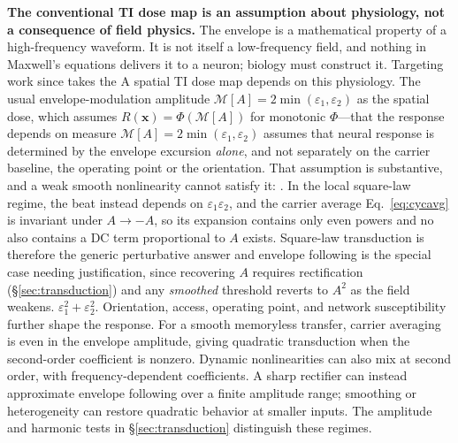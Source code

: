 \documentclass[11pt,a4paper]{article}
\providecommand{\DIFaddtex}[1]{{\protect\color{blue} \sf #1}} %
\providecommand{\DIFdeltex}[1]{{\protect\color{red} \scriptsize #1}} %
\providecommand{\DIFaddbegin}{} %
\providecommand{\DIFaddend}{} %
\providecommand{\DIFdelbegin}{} %
\providecommand{\DIFdelend}{} %
\providecommand{\DIFadd}[1]{\texorpdfstring{\DIFaddtex{#1}}{#1}} %
\providecommand{\DIFdel}[1]{\texorpdfstring{\DIFdeltex{#1}}{}} %
\begin{document}
\DIFdelbegin \DIFdel{\textbf{The conventional TI dose map is an assumption about physiology, not a consequence
of field physics.} The envelope is a mathematical property of a high-frequency waveform. It
is not
itself a low-frequency field, and nothing in Maxwell's equations delivers it to a
neuron; biology must construct it.
Targeting work since \cite{grossman2017} takes the
}\DIFdelend \DIFaddbegin \DIFadd{A spatial TI dose map depends on this physiology. The usual }\DIFaddend envelope-modulation
\DIFdelbegin \DIFdel{amplitude $\mathcal{M}[A]=2\min(\varepsilon_1,\varepsilon_2)$ as the
spatial dose, which assumes $R(\mathbf{x})=\Phi(\mathcal{M}[A])$ for monotonic $\Phi$---that
the response depends on }\DIFdelend \DIFaddbegin \DIFadd{measure $\mathcal M[A]=2\min(\varepsilon_1,\varepsilon_2)$ assumes that neural
response is determined by }\DIFaddend the envelope excursion\DIFdelbegin \DIFdel{\emph{alone}, and not separately on the carrier baseline,
the operating point or the orientation. That assumption is substantive, and a weak smooth nonlinearity cannot satisfy it: }\DIFdelend \DIFaddbegin \DIFadd{. In the local square-law regime,
the beat instead depends on $\varepsilon_1\varepsilon_2$, and }\DIFaddend the carrier average
\DIFdelbegin \DIFdel{Eq.~\eqref{eq:cycavg} is invariant under $A\to-A$, so its expansion contains only even
powers and no }\DIFdelend \DIFaddbegin \DIFadd{also contains a DC }\DIFaddend term proportional to \DIFdelbegin \DIFdel{$A$ exists.
Square-law transduction is therefore the
generic perturbative answer and envelope following is the special case needing
justification, since recovering $A$ requires rectification (\S\ref{sec:transduction}) and
any \emph{smoothed} threshold reverts to $A^2$ as the field weakens.
}\DIFdelend \DIFaddbegin \DIFadd{$\varepsilon_1^2+\varepsilon_2^2$.
Orientation, access, operating point, and network susceptibility further shape
the response. For a smooth memoryless transfer, carrier averaging is even in the
envelope amplitude, giving quadratic transduction when the second-order coefficient
is nonzero. Dynamic nonlinearities can also mix at second order, with
frequency-dependent coefficients. A sharp rectifier can instead approximate
envelope following over a finite amplitude range; smoothing or heterogeneity
can restore quadratic behavior at smaller inputs. The amplitude and harmonic
tests in \S\ref{sec:transduction} distinguish these regimes.
}\DIFaddend
\end{document}
